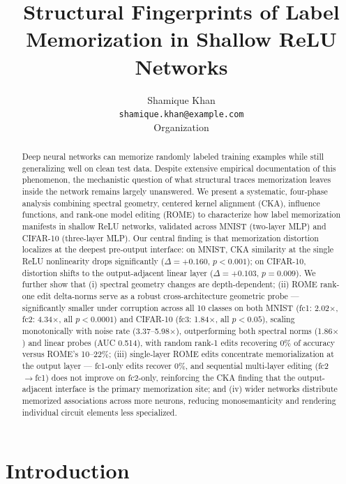 \documentclass{article}
\title{Structural Fingerprints of Label Memorization in Shallow ReLU Networks}
\author{
  Shamique Khan \\
  \texttt{shamique.khan@example.com} \\
  Organization
}
\begin{document}
\maketitle

\begin{abstract}
Deep neural networks can memorize randomly labeled training examples while still generalizing well on clean test data. Despite extensive empirical documentation of this phenomenon, the mechanistic question of what structural traces memorization leaves inside the network remains largely unanswered. We present a systematic, four-phase analysis combining spectral geometry, centered kernel alignment (CKA), influence functions, and rank-one model editing (ROME) to characterize how label memorization manifests in shallow ReLU networks, validated across MNIST (two-layer MLP) and CIFAR-10 (three-layer MLP). Our central finding is that memorization distortion localizes at the deepest pre-output interface: on MNIST, CKA similarity at the single ReLU nonlinearity drops significantly ($\Delta = +0.160$, $p < 0.001$); on CIFAR-10, distortion shifts to the output-adjacent linear layer ($\Delta = +0.103$, $p = 0.009$). We further show that (i) spectral geometry changes are depth-dependent; (ii) ROME rank-one edit delta-norms serve as a robust cross-architecture geometric probe — significantly smaller under corruption across all 10 classes on both MNIST (fc1: 2.02$\times$, fc2: 4.34$\times$, all $p < 0.0001$) and CIFAR-10 (fc3: 1.84$\times$, all $p < 0.05$), scaling monotonically with noise rate (3.37--5.98$\times$), outperforming both spectral norms (1.86$\times$) and linear probes (AUC 0.514), with random rank-1 edits recovering 0\% of accuracy versus ROME's 10--22\%; (iii) single-layer ROME edits concentrate memorialization at the output layer — fc1-only edits recover 0\%, and sequential multi-layer editing (fc2$\to$fc1) does not improve on fc2-only, reinforcing the CKA finding that the output-adjacent interface is the primary memorization site; and (iv) wider networks distribute memorized associations across more neurons, reducing monosemanticity and rendering individual circuit elements less specialized.
\end{abstract}

\section{Introduction}
\label{sec:introduction}
\end{document}

